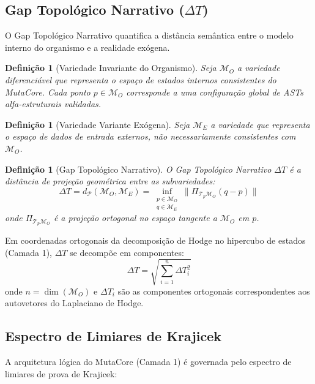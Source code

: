 \documentclass[11pt,a4paper]{article}
\newtheorem{definition}[theorem]{Definição}
\newcommand{\DeltaT}{\Delta T}
\newcommand{\MT}{\mathcal{M}_O}
\newcommand{\ME}{\mathcal{M}_E}
\begin{document}
\subsection{Gap Topológico Narrativo ($\DeltaT$)}

O Gap Topológico Narrativo quantifica a distância semântica entre o modelo interno do organismo e a realidade exógena.

\begin{definition}[Variedade Invariante do Organismo]
Seja $\MT$ a variedade diferenciável que representa o espaço de estados internos consistentes do MutaCore. Cada ponto $p \in \MT$ corresponde a uma configuração global de ASTs alfa-estruturais validadas.
\end{definition}

\begin{definition}[Variedade Variante Exógena]
Seja $\ME$ a variedade que representa o espaço de dados de entrada externos, não necessariamente consistentes com $\MT$.
\end{definition}

\begin{definition}[Gap Topológico Narrativo]
O Gap Topológico Narrativo $\DeltaT$ é a distância de projeção geométrica entre as subvariedades:
\begin{equation}
    \DeltaT = d_{\mathcal{P}}(\MT, \ME) = \inf_{\substack{p \in \MT \\ q \in \ME}} \| \Pi_{\mathcal{T}_p\MT}(q - p) \|
    \label{eq:deltaT}
\end{equation}
onde $\Pi_{\mathcal{T}_p\MT}$ é a projeção ortogonal no espaço tangente a $\MT$ em $p$.
\end{definition}

Em coordenadas ortogonais da decomposição de Hodge no hipercubo de estados (Camada 1), $\DeltaT$ se decompõe em componentes:
\begin{equation}
    \DeltaT = \sqrt{\sum_{i=1}^{n} \DeltaT_i^2}
\end{equation}
onde $n = \dim(\MT)$ e $\DeltaT_i$ são as componentes ortogonais correspondentes aos autovetores do Laplaciano de Hodge.

\subsection{Espectro de Limiares de Krajicek}

A arquitetura lógica do MutaCore (Camada 1) é governada pelo espectro de limiares de prova de Krajicek:
\end{document}
